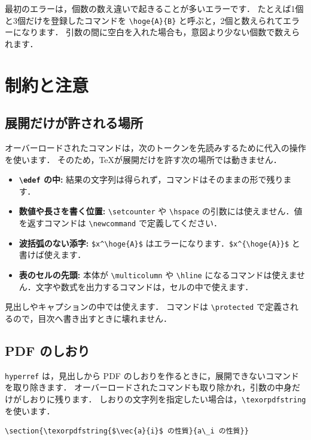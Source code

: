 \documentclass[lualatex,ja = standard,a4paper,11pt]{bxjsarticle}
\begin{document}
最初のエラーは，個数の数え違いで起きることが多いエラーです．
たとえば1個と3個だけを登録したコマンドを \verb|\hoge{A}{B}| と呼ぶと，2個と数えられてエラーになります．
引数の間に空白を入れた場合も，意図より少ない個数で数えられます．

\section{制約と注意}

\subsection{展開だけが許される場所}

オーバーロードされたコマンドは，次のトークンを先読みするために代入の操作を使います．
そのため，\TeX が展開だけを許す次の場所では動きません．

\begin{itemize}
\item \textbf{\texttt{\textbackslash edef} の中:}
  結果の文字列は得られず，コマンドはそのままの形で残ります．
\item \textbf{数値や長さを書く位置:}
  \verb|\setcounter| や \verb|\hspace| の引数には使えません．値を返すコマンドは \verb|\newcommand| で定義してください．
\item \textbf{波括弧のない添字:}
  \verb|$x^\hoge{A}$| はエラーになります．\verb|$x^{\hoge{A}}$| と書けば使えます．
\item \textbf{表のセルの先頭:}
  本体が \verb|\multicolumn| や \verb|\hline| になるコマンドは使えません．文字や数式を出力するコマンドは，セルの中で使えます．
\end{itemize}

見出しやキャプションの中では使えます．
コマンドは \verb|\protected| で定義されるので，目次へ書き出すときに壊れません．

\subsection{PDF のしおり}

\texttt{hyperref} は，見出しから PDF のしおりを作るときに，展開できないコマンドを取り除きます．
オーバーロードされたコマンドも取り除かれ，引数の中身だけがしおりに残ります．
しおりの文字列を指定したい場合は，\verb|\texorpdfstring| を使います．

\begin{lstlisting}
\section{\texorpdfstring{$\vec{a}{i}$ の性質}{a\_i の性質}}
\end{lstlisting}
\end{document}
